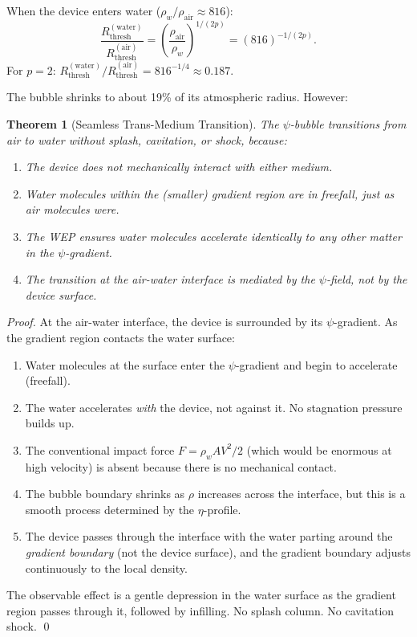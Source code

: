 \documentclass[12pt, letterpaper]{article}
\newtheorem{theorem}{Theorem}
\theoremstyle{definition}
\theoremstyle{remark}
\begin{document}
When the device enters water ($\rho_w / \rho_{\mathrm{air}} \approx 816$):
\begin{equation}
\frac{R_{\mathrm{thresh}}^{(\mathrm{water})}}{R_{\mathrm{thresh}}^{(\mathrm{air})}}
= \left(\frac{\rho_{\mathrm{air}}}{\rho_w}\right)^{1/(2p)}
= (816)^{-1/(2p)}.
\end{equation}
For $p = 2$: $R_{\mathrm{thresh}}^{(\mathrm{water})} / R_{\mathrm{thresh}}^{(\mathrm{air})} = 816^{-1/4} \approx 0.187$.

The bubble shrinks to about 19\% of its atmospheric radius. However:

\begin{theorem}[Seamless Trans-Medium Transition]
\label{thm:transmedium}
The $\psi$-bubble transitions from air to water without splash, cavitation, or
shock, because:
\begin{enumerate}
\item The device does not mechanically interact with either medium.
\item Water molecules within the (smaller) gradient region are in freefall, just
as air molecules were.
\item The WEP ensures water molecules accelerate identically to any other matter
in the $\psi$-gradient.
\item The transition at the air-water interface is mediated by the $\psi$-field,
not by the device surface.
\end{enumerate}
\end{theorem}

\begin{proof}
At the air-water interface, the device is surrounded by its $\psi$-gradient.
As the gradient region contacts the water surface:
\begin{enumerate}
\item Water molecules at the surface enter the $\psi$-gradient and begin to
accelerate (freefall).
\item The water accelerates \emph{with} the device, not against it. No
stagnation pressure builds up.
\item The conventional impact force $F = \rho_w A V^2 / 2$ (which would be
enormous at high velocity) is absent because there is no mechanical contact.
\item The bubble boundary shrinks as $\rho$ increases across the interface,
but this is a smooth process determined by the $\eta$-profile.
\item The device passes through the interface with the water parting around the
\emph{gradient boundary} (not the device surface), and the gradient boundary
adjusts continuously to the local density.
\end{enumerate}
The observable effect is a gentle depression in the water surface as the
gradient region passes through it, followed by infilling. No splash column.
No cavitation shock. \qed
\end{proof}
\end{document}
